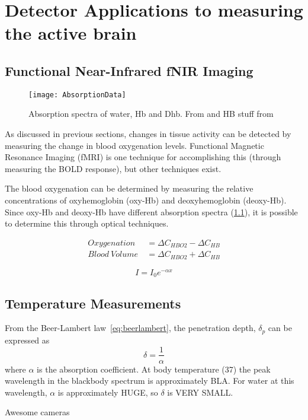 \chapter{Detector Applications to measuring the active brain}

\section{{F}unctional {N}ear-{I}nfrared {fNIR} Imaging}
\begin{figure}[b]
  \begin{center}
    \texttt{[image: AbsorptionData]}
    \caption[Absorption spectra of water, deoxyhemoglobin and oxyhemoblogin]{\label{fig:fnirabsorption} Absorption spectra of water, Hb and Dhb.  From \citet{cope} and HB stuff from \citet{horecker} }
  \end{center}
\end{figure}

As discussed in previous sections, changes in tissue activity can be detected by measuring the change in blood oxygenation levels.  Functional Magnetic Resonance Imaging (fMRI) is one technique for accomplishing this (through measuring the BOLD response), but other techniques exist.  

The blood oxygenation can be determined by measuring the relative concentrations of oxyhemoglobin (oxy-Hb) and deoxyhemoglobin (deoxy-Hb).  Since oxy-Hb and deoxy-Hb have different absorption spectra (\cref{fig:fnirabsorption}), it is possible to determine this through optical techniques.

\begin{align}
  \label{eq:o2bloodvolume}
  Oxygenation\ &= \Delta C_{HBO2} - \Delta C_{HB} \nonumber \\
  Blood\ Volume\ &= \Delta C_{HBO2} + \Delta C_{HB} 
\end{align}

\begin{equation}
  I = I_0 e^{-\alpha x} \label{eq:beerlambert}
\end{equation}


\section{Temperature Measurements}


From the Beer-Lambert law~\cref{eq:beerlambert}, the penetration depth, $\delta_{p}$ can be expressed as 
\begin{equation}
  \delta = \frac{1}{\alpha} \label{eq:penetrationdepth}
\end{equation}
where $\alpha$ is the absorption coefficient.  At body temperature (37\degree) the peak wavelength in the blackbody spectrum is approximately BLA.  For water at this wavelength, $\alpha$ is approximately HUGE, so $\delta$ is VERY SMALL. 


Awesome cameras~\citep{flir,ici}

